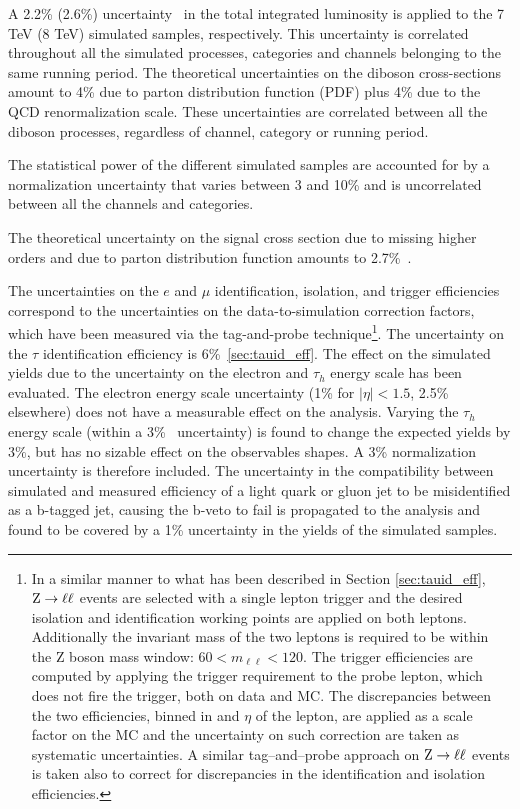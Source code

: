 A 2.2\% (2.6\%) uncertainty~\cite{lumi-uncertainty} in the total integrated luminosity is applied to the 7 TeV (8 TeV) simulated samples, respectively. This uncertainty is correlated throughout all the simulated processes, categories and channels belonging to the same running period.
The theoretical uncertainties on %
the diboson cross-sections amount to 4\% due to parton distribution function (PDF) plus 4\% due to the QCD renormalization scale. These uncertainties are correlated between all the diboson processes, regardless of channel, category or running period.

The statistical power of the different simulated samples are accounted for by a normalization uncertainty that varies between 3 and 10\% and is uncorrelated between all the channels and categories.

The theoretical uncertainty on the signal cross section due to missing higher orders %
and due to parton distribution function amounts to 2.7\%~\cite{LHCHiggsCrossSectionWorkingGroup:2011ti}.

The uncertainties on the $e$ and $\mu$ identification, isolation, and trigger efficiencies correspond to the uncertainties on the data-to-simulation correction factors, which have been measured via the tag-and-probe technique\footnote{In a similar manner to what has been described in Section \ref{sec:tauid_eff}, $\mathrm{Z} \rightarrow \ell \ell$ events are selected with a single lepton trigger and the desired isolation and identification working points are applied on both leptons. Additionally the invariant mass of the two leptons is required to be within the Z boson mass window: $60 < m_{\ell\ell} < 120$. The trigger efficiencies are computed by applying the trigger requirement to the probe lepton, which does not fire the trigger, both on data and MC. The discrepancies between the two efficiencies, binned in \pT and $\eta$ of the lepton, are applied as a scale factor on the MC and the uncertainty on such correction are taken as systematic uncertainties. A similar tag--and--probe approach on $\mathrm{Z} \rightarrow \ell \ell$ events is taken also to correct for discrepancies in the identification and isolation efficiencies.}.
The uncertainty on the $\tau$ identification efficiency is 6\%~\ref{sec:tauid_eff}.
The effect on the simulated yields due to the uncertainty on the electron and $\tau_h$ energy scale has been evaluated.
The electron energy scale uncertainty (1\% for $|\eta| < 1.5$, 2.5\% elsewhere) does not have a measurable effect on the analysis.
Varying the $\tau_h$ energy scale (within a 3\%~\cite{H_tautau} uncertainty) is found to change the expected yields by $3\%$, but has no sizable effect on the observables shapes. A 3\% normalization uncertainty is therefore included.
The uncertainty in the compatibility between simulated and measured efficiency of a light quark or gluon jet to be misidentified as a b-tagged jet, causing the b-veto to 
fail is propagated to the analysis and found to be covered by a 1\% uncertainty in the yields of the simulated samples.

